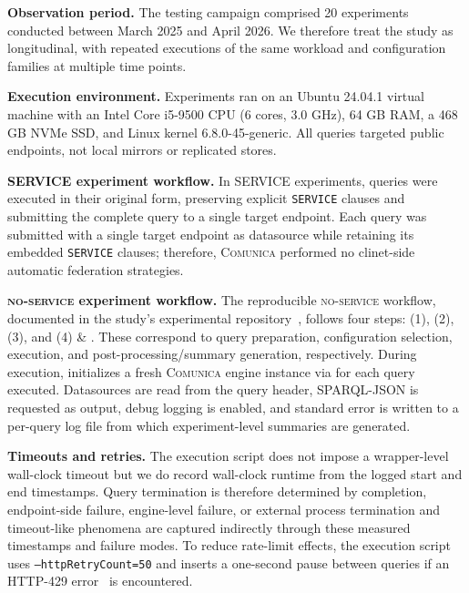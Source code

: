 \documentclass[runningheads]{llncs}
\begin{document}
\textbf{Observation period.}
The testing campaign comprised 20 experiments conducted between March 2025 and April 2026. 
We therefore treat the study as longitudinal, with repeated executions of the same workload and configuration families at multiple time points.

\textbf{Execution environment.}
Experiments ran on an Ubuntu 24.04.1 virtual machine with an Intel Core i5-9500 CPU (6 cores, 3.0 GHz), 64 GB RAM, a 468 GB NVMe SSD, and Linux kernel 6.8.0-45-generic. 
All queries targeted public endpoints, not local mirrors or replicated stores.

\textbf{\textsc{SERVICE} experiment workflow.}
In \textsc{SERVICE} experiments, queries were executed in their original form, preserving explicit \texttt{SERVICE} clauses and submitting the complete query to a single target endpoint. 
Each query was submitted with a single target endpoint as datasource while retaining its embedded \texttt{SERVICE} clauses; therefore, \textsc{Comunica} performed no clinet-side automatic federation strategies. 

\textbf{\textsc{no-service} experiment workflow.}
The reproducible \textsc{no-service} workflow, documented in the study's experimental repository~\cite{fedSparqlSurveyExperimentsRepo}, follows four steps:
(1)\textsc{}, (2)\textsc{}, 
(3)\textsc{}, and (4)\textsc{} \& \textsc{}.
These correspond to query preparation, configuration selection, execution, and post-processing/summary generation, respectively. 
During execution, \texttt{} initializes a fresh \textsc{Comunica} engine instance via \texttt{} for each query executed. 
Datasources are read from the query header, SPARQL-JSON\cite{sparql11resultsjson} is requested as output, debug logging is enabled, and standard error is written to a per-query log file from which experiment-level summaries are generated. 

\textbf{Timeouts and retries.}
The execution script does not impose a wrapper-level wall-clock timeout but we do record wall-clock runtime from the logged start and end timestamps. 
Query termination is therefore determined by completion, endpoint-side failure, engine-level failure, or external process termination and timeout-like phenomena are captured indirectly through these measured timestamps and failure modes. 
To reduce rate-limit effects, the execution script uses \texttt{--httpRetryCount=50} and inserts a one-second pause between queries if an HTTP-429 error~\cite{Nottingham2012RFC6585} is encountered.
\end{document}
